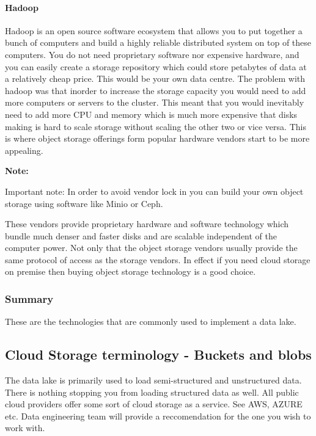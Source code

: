 \documentclass[a4paper, 11pt]{book}
\newenvironment{note}{
    \begin{siderule}
        \textbf{Note: }
        }{
    \end{siderule}}
\begin{document}
    \paragraph{Hadoop}
    Hadoop is an open source software ecosystem that allows you to put together a bunch of computers and build a highly reliable distributed system on top of these computers.
    You do not need proprietary software nor expensive hardware, and you can easily create a storage repository which could store petabytes of data at a relatively cheap price.
    This would be your own data centre.
    The problem with hadoop was that inorder to increase the storage capacity you would need to add more computers or servers to the cluster.
    This meant that you would inevitably need to add more CPU and memory which is much more expensive that disks making is hard to scale storage without scaling the other two or vice versa.
    This is where object storage offerings form popular hardware vendors start to be more appealing.
    \begin{note}
        Important note: In order to avoid vendor lock in you can build your own object storage using software like Minio or Ceph.
    \end{note}

    These vendors provide proprietary hardware and software technology which bundle much denser and faster disks and are scalable independent of the computer power.
    Not only that the object storage vendors usually provide the same protocol of access as the storage vendors.
    In effect if you need cloud storage on premise then buying object storage technology is a good choice.

    \subsubsection{Summary}
    These are the technologies that are commonly used to implement a data lake.

    \subsection{Cloud Storage terminology - Buckets and blobs}

    The data lake is primarily used to load semi-structured and unstructured data.
    There is nothing stopping you from loading structured data as well.
    All public cloud providers offer some sort of cloud storage as a service.
    See AWS, AZURE etc. Data engineering team will provide a reccomendation for the one you wish to work with.
\end{document}
